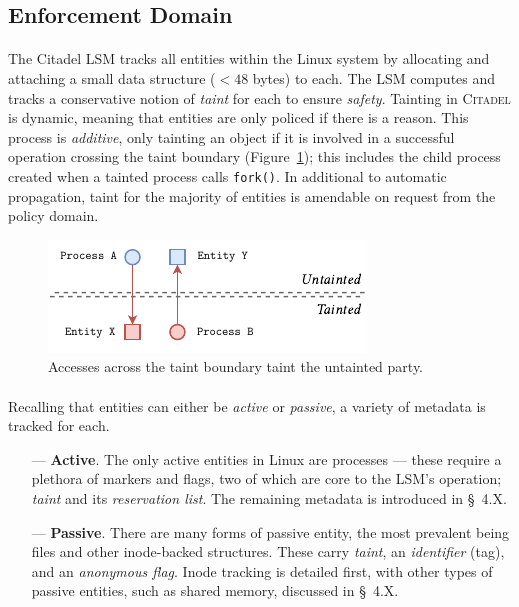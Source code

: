 \subsection{Enforcement Domain}
\label{sec:enforcement-domain}

\paragraph{} The Citadel LSM tracks all entities within the Linux system by allocating and attaching a small data structure ($<48$ bytes) to each. The LSM computes and tracks a conservative notion of \textit{taint} for each to ensure \textit{safety}. Tainting in \textsc{Citadel} is dynamic, meaning that entities are only policed if there is a reason. This process is \textit{additive}, only tainting an object if it is involved in a successful operation crossing the taint boundary (Figure~\ref{fig:taint-boundary}); this includes the child process created when a tainted process calls \texttt{fork()}. In additional to automatic propagation, taint for the majority of entities is amendable on request from the policy domain.

\begin{figure}[]
    \centering
    \includegraphics[width=0.55\linewidth]{figures/CitadelTaint.pdf}
    \caption[Accesses across the taint boundary]{Accesses across the taint boundary taint the untainted party.}
    \label{fig:taint-boundary}
\end{figure}

\paragraph{} Recalling that entities can either be \textit{active} or \textit{passive}, a variety of metadata is tracked for each.

\begin{enumerate}
    \item[---]\textbf{Active}. The only active entities in Linux are processes --- these require a plethora of markers and flags, two of which are core to the LSM's operation; \textit{taint} and its \textit{reservation list}. The remaining metadata is introduced in §~4.X.
    \item[---] \textbf{Passive}. There are many forms of passive entity, the most prevalent being files and other inode-backed structures. These carry \textit{taint}, an \textit{identifier} (tag), and an \textit{anonymous flag}. Inode tracking is detailed first, with other types of passive entities, such as shared memory, discussed in §~4.X. 
\end{enumerate}

